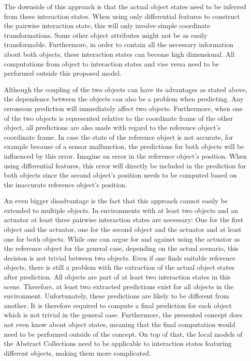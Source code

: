 The downside of this approach is that the actual object states need to be inferred from these interaction states. When using only differential features to construct the pairwise interaction state, this will only involve simple coordinate transformations. Some other object attributes might not be as easily transformable. Furthermore, in order to contain all the necessary information about both objects, these interaction states can become high dimensional. All computations from object to interaction states and vise versa need to be performed outside this proposed model.

Although the coupling of the two objects can have its advantages as stated above, the dependence between the objects can also be a problem when predicting. Any erroneous prediction will immediately affect two objects. 
Furthermore, when one of the two objects is represented relative to the coordinate frame of the other object, all predictions are also made with regard to the reference object's coordinate frame. 
In case the state of the reference object is not accurate, for example because of a sensor malfunction, the predictions for both objects will be influenced by this error. Imagine an error in the reference object's position. When using differential features, this error will directly be included in the prediction for both objects since the second object's position needs to be computed based on the inaccurate reference object's position.

An even bigger disadvantage is the fact that this approach cannot easily be extended to multiple objects. In environments with at least two objects and an actuator at least three pairwise interaction states are necessary: One for the first object and the actuator, one for the second object and the actuator and at least one for both objects. 
While one can argue for and against using the actuator as the reference object for the general case, depending on the actual scenario, this decision is not trivial between two objects. 
Even if one finds suitable reference objects, there is still a problem with the extraction of the actual object states after prediction. All objects are part of at least two interaction states in this scene. Therefore, at least two extracted predictions exist for all objects in the environment. Unfortunately, these predictions are likely to be different from another. It is therefore required to compute a final prediction for each object which is not trivial in the general case. Furthermore, the presented concept does not even know about object states, meaning that the final computation would need to be performed outside of the concept.
On top of that, the local models of the Abstract Collections need to be applicable to interaction states featuring different objects, making them more complicated.

